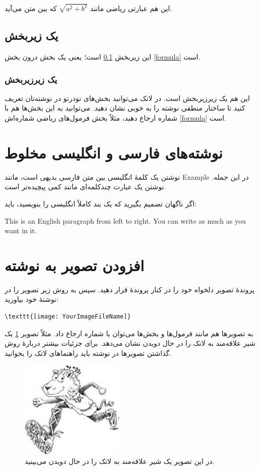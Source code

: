 این هم عبارتی ریاضی مانند 
$\sqrt{a^2+b^2}$
 که بین متن می‌آید.
\subsection{یک زیربخش}
\label{zirbakhsh}

این زیربخش \ref{zirbakhsh} است؛ یعنی یک بخش درون بخش \ref{formula} است.
\subsubsection{یک زیرزیربخش}
این هم یک زیرزیربخش است. در لاتک می‌توانید بخش‌های تودرتو در نوشته‌تان تعریف کنید تا ساختار منطقی نوشته را به خوبی نشان دهید. می‌توانید به این بخش‌ها هم با شماره ارجاع دهید، مثلاً بخش فرمول‌های ریاضی شماره‌اش \ref{formula} است.
\section{نوشته‌های فارسی و انگلیسی مخلوط}
نوشتن یک کلمهٔ انگلیسی بین متن فارسی بدیهی است، مانند Example در این جمله.
نوشتن یک عبارت چندکلمه‌ای مانند
  کمی پیچیده‌تر است.

اگر ناگهان تصمیم بگیرید که یک بند کاملاً انگلیسی را بنویسید، باید:
\begin{latin}
This is an English paragraph from left to right. You can write as much as you want in it.
\end{latin}
\section{افزودن تصویر به نوشته}
پروندهٔ تصویر دلخواه خود را در کنار پروندهٔ  قرار دهید. سپس به روش زیر تصویر را در نوشتهٔ خود بیاورید:
\begin{latin}
\begin{verbatim}
\texttt{[image: YourImageFileName]}
\end{verbatim}
\end{latin}
به تصویرها هم مانند فرمول‌ها و بخش‌ها می‌توان با شماره ارجاع داد. مثلاً تصویر \ref{fig:shir} یک شیر علاقه‌مند به لاتک را در حال دویدن نشان می‌دهد. برای جزئیات بیشتر دربارهٔ روش گذاشتن تصویرها در نوشته باید راهنماهای لاتک را بخوانید.
\begin{figure}[ht]
\centerline{\includegraphics[width=5cm]{lion}}
\caption{در این تصویر یک شیر علاقه‌مند به لاتک را در حال دویدن می‌بینید.}
\label{fig:shir}
\end{figure}

